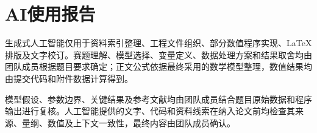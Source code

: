 \section*{AI使用报告}

生成式人工智能仅用于资料索引整理、工程文件组织、部分数值程序实现、LaTeX 排版及文字校订。赛题理解、模型选择、变量定义、数据处理方案和结果取舍均由团队成员根据题目要求确定；正文公式依据最终采用的数学模型整理，数值结果均由提交代码和附件数据计算得到。

模型假设、参数边界、关键结果及参考文献均由团队成员结合题目原始数据和程序输出进行复核。人工智能提供的文字、代码和资料线索在纳入论文前均检查其来源、量纲、数值及上下文一致性，最终内容由团队成员确认。
